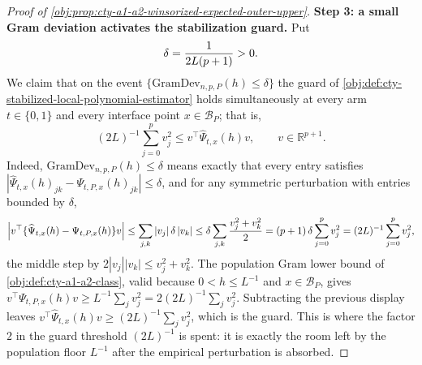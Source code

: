 \documentclass[11pt]{article}
\begin{document}
\begin{proof}[Proof of \cref{obj:prop:cty-a1-a2-winsorized-expected-outer-upper}]
\textbf{Step 3: a small Gram deviation activates the stabilization guard.}  Put
\[
\delta={1\over2L(p+1)} >0 .
\]
We claim that on the event \(\{\mathrm{GramDev}_{n,p,P}(h)\leq\delta\}\) the guard of \cref{obj:def:cty-stabilized-local-polynomial-estimator} holds simultaneously at every arm \(t\in\{0,1\}\) and every interface point \(x\in\mathcal B_P\); that is,
\[
(2L)^{-1}\sum_{j=0}^p v_j^2
\leq
v^\top\widehat\Psi_{t,x}(h)v,
\qquad v\in\mathbb R^{p+1} .
\]
Indeed, \(\mathrm{GramDev}_{n,p,P}(h)\leq\delta\) means exactly that every entry satisfies \(|\widehat\Psi_{t,x}(h)_{jk}-\Psi_{t,P,x}(h)_{jk}|\leq\delta\), and for any symmetric perturbation with entries bounded by \(\delta\),
\[
\left|v^\top\{\widehat\Psi_{t,x}(h)-\Psi_{t,P,x}(h)\}v\right|
\leq
\sum_{j,k}|v_j|\,\delta\,|v_k|
\leq
\delta\sum_{j,k}{v_j^2+v_k^2\over2}
=
(p+1)\,\delta\sum_{j=0}^pv_j^2
=
(2L)^{-1}\sum_{j=0}^pv_j^2 ,
\]
the middle step by \(2|v_j||v_k|\leq v_j^2+v_k^2\).
The population Gram lower bound of \cref{obj:def:cty-a1-a2-class}, valid because \(0<h\leq L^{-1}\) and \(x\in\mathcal B_P\), gives \(v^\top\Psi_{t,P,x}(h)v\geq L^{-1}\sum_jv_j^2=2(2L)^{-1}\sum_jv_j^2\).  Subtracting the previous display leaves \(v^\top\widehat\Psi_{t,x}(h)v\geq(2L)^{-1}\sum_jv_j^2\), which is the guard.  This is where the factor \(2\) in the guard threshold \((2L)^{-1}\) is spent: it is exactly the room left by the population floor \(L^{-1}\) after the empirical perturbation is absorbed.


\end{proof}
\end{document}
